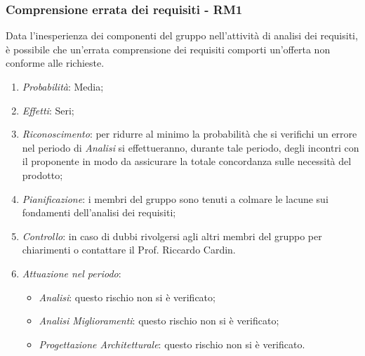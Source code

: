 \subsubsection{Comprensione errata dei requisiti - RM1}
Data l'inesperienza dei componenti del gruppo nell'attivit\`a di analisi dei requisiti, \`e possibile che un'errata comprensione dei requisiti comporti un'offerta non conforme alle richieste.
\begin{enumerate}
\item \textit{Probabilit\`a}: Media;
\item \textit{Effetti}: Seri;
\item \textit{Riconoscimento}: per ridurre al minimo la probabilità che si verifichi un errore nel periodo di \textit{Analisi} si effettueranno, durante tale periodo, degli incontri con il proponente in modo da assicurare la totale concordanza sulle necessità del prodotto;
\item \textit{Pianificazione}: i membri del gruppo sono tenuti a colmare le lacune sui fondamenti dell'analisi dei requisiti;
\item \textit{Controllo}: in caso di dubbi rivolgersi agli altri membri del gruppo per chiarimenti o contattare il Prof. Riccardo Cardin.
\item \textit{Attuazione nel periodo}: 
	\begin{itemize}
	\item \textit{Analisi}: questo rischio non si è verificato;
	\item \textit{Analisi Miglioramenti}: questo rischio non si è verificato;
	\item \textit{Progettazione Architetturale}: questo rischio non si è verificato.
	\end{itemize}
\end{enumerate}

